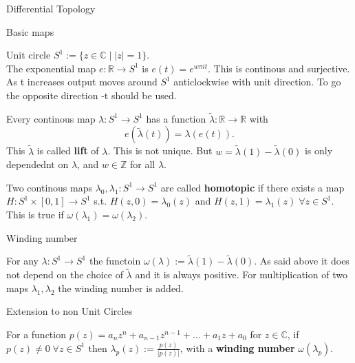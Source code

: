 \documentclass[12pt, letterpaper]{article}
\begin{document}
\begin{section}{Differential Topology}

  \begin{subsection}{Basic maps}

    Unit circle \(S^{1} := \{ z \in \mathbb{C} \; | \; |z| = 1 \}\). \\
    The exponential map \(e: \mathbb{R} \to S^{1}\) is \(e(t) = e^{w\pi{}it}\).
    This is continous and surjective. As t increases output moves around \(S^{1}\)
    anticlockwise with unit direction. To go the opposite direction -t should be used.

    Every continous map \(\lambda : S^{1} \to S^{1}\) has a function
    \(\tilde\lambda : \mathbb{R} \to \mathbb{R}\) with
    \[e(\tilde\lambda(t)) = \lambda(e(t)).\] This \(\tilde\lambda\) is called
    \textbf{lift} of \(\lambda\). This is not unique.
    But \(w = \tilde\lambda(1) - \tilde\lambda(0)\) is only dependednt on \(\lambda\),
    and \(w \in \mathbb{Z}\) for all \(\lambda\).

    Two continous maps \(\lambda_{0}, \lambda_{1} : S^{1} \to S^{1}\) are called
    \textbf{homotopic} if there exists a map \(H: S^{1} \times [0, 1] \to S^{1}\)
    s.t. \(H(z, 0) = \lambda_{0}(z)\) and \(H(z, 1) = \lambda_{1}(z) \;
    \forall z \in S^{1}\). This is true if \(\omega(\lambda_{1}) = \omega(\lambda_{2})\).

  \end{subsection}

  \begin{subsection}{Winding number}

    For any \(\lambda : S^{1} \to S^{1}\) the functoin
    \(\omega(\lambda) := \tilde\lambda(1) - \tilde\lambda(0)\). As said above it
    does not depend on the choice of \(\tilde\lambda\) and it is always
    positive. For multiplication of two maps \(\lambda_{1}, \lambda_{2}\)
    the winding number is added.

  \end{subsection}

  \begin{subsection}{Extension to non Unit Circles}

    For a function \(p(z) = a_{n}z^{n} + a_{n - 1}z^{n - 1} + \dots + a_{1}z + a_{0}\)
    for \(z \in \mathbb{C}\), if \(p(z) \neq 0 \; \forall z \in S^{1}\) then
    \(\lambda_{p}(z) := \frac{p(z)}{|p(z)|}\), with a \textbf{winding number}
    \(\omega(\lambda_{p})\).

  \end{subsection}


\end{section}
\end{document}
